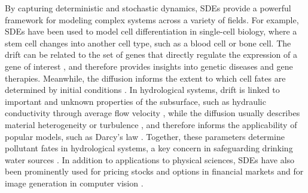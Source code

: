 \documentclass[twoside,11pt]{article}
\begin{document}
By capturing deterministic and stochastic dynamics, SDEs provide a powerful framework for modeling complex systems across a variety of fields. For example, SDEs have been used to model cell differentiation in single-cell biology, where a stem cell changes into another cell type, such as a blood cell or bone cell. 
The drift can be related to the set of genes that directly regulate the expression of a gene of interest \citep{zhang2024joint,aalto2020gene,atanackovic2024dyngfn,zhao2024optimal,tejada2023causal}, and therefore provides insights into genetic diseases and gene therapies. Meanwhile, the diffusion informs the extent to which cell fates are determined by initial conditions \citep{forrow2024consistent}. In hydrological systems, drift is linked to important and unknown properties of the subsurface, such as hydraulic conductivity through average flow velocity \citep{hazas2023evolution,beven1993dispersion}, while the diffusion usually describes material heterogeneity or turbulence \citep{beven1993dispersion}, and therefore informs the applicability of popular models, such as Darcy's law \citep{man2007stochastic,oh2010stochastic,lichtner2002new}. Together, these parameters determine pollutant fates in hydrological systems, a key concern in safeguarding drinking water sources \citep{o2002part,frind2006well,locatelli2019simple,chen1999assessment,paulson1997transport,cahill2019advancing}. In addition to applications to physical sciences, SDEs have also been prominently used for pricing stocks and options in financial markets \citep{black1973pricing} and for image generation in computer vision \citep{meng2021sdedit}. 
\end{document}
